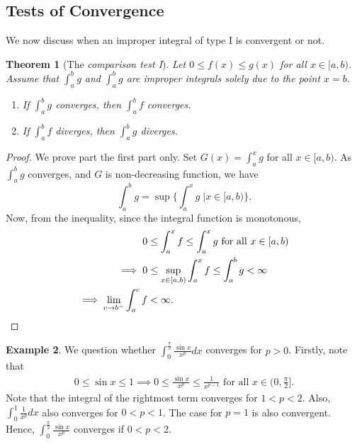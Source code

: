 \documentclass[15pt,a4paper]{book}
\newtheorem{theorem}{Theorem}[chapter]
\theoremstyle{definition}
\newtheorem{example}[theorem]{Example}
\newcommand{\eax}[1]{\emph{#1}\index{#1}} %
\begin{document}
\subsection{Tests of Convergence}
We now discuss when an improper integral of type I is convergent or not.
\begin{theorem}[The \eax{comparison test I}]
    Let $0 \leq f(x) \leq g(x)$ for all $x \in [a,b)$. Assume that $\int_{a}^{b} g$ and $\int_{a}^{b} g$ are improper integrals solely due to the point $x = b$.
    \begin{enumerate}
        \item If $\int_{a}^{b} g$ converges, then $\int_{a}^{b} f$ converges.
        \item If $\int_{a}^{b} f$ diverges, then $\int_{a}^{b} g$ diverges.
    \end{enumerate}
\end{theorem}
\begin{proof}
    We prove part the first part only. Set $G(x) = \int_{a}^{x} g$ for all $x \in [a,b)$. As $\int_{a}^{b} g$ converges, and $G$ is non-decreasing function, we have
    \begin{equation*}
        \int_{a}^{b} g = \sup \{\int_{a}^{x} g \; | x \in [a,b) \}.
    \end{equation*}
    Now, from the inequality, since the integral function is monotonous,
    \begin{align}
        0 &\leq \int_{a}^{x} f \leq \int_{a}^{x} g \text{ for all } x \in [a,b) \notag \\
        \implies 0 &\leq \sup_{x \in [a,b)} \int_{a}^{x} f \leq \int_{a}^{b} g < \infty \\
        \implies \lim_{c \to b^{-}} \int_{a}^{c} f &< \infty.
    \end{align}
\end{proof}

\begin{example}
    We question whether $\int_{0}^{\frac{\pi}{2}} \frac{\sin x}{x^{p}} dx$ converges for $p > 0$. Firstly, note that
    \begin{align*}
        0 \leq \sin x \leq 1 \implies 0 \leq \frac{\sin x}{x^{p}} \leq \frac{1}{x^{p-1}} \text{ for all } x \in (0, \frac{\pi}{2}].
    \end{align*}
    Note that the integral of the rightmost term converges for $1 < p < 2$. Also, $\int_{0}^{1} \frac{1}{x^{p}} dx$ also converges for $0 < p < 1$. The case for $p = 1$ is also convergent. Hence, $\int_{0}^{\frac{\pi}{2}} \frac{\sin x}{x^{p}}$ converges if $0 < p < 2$.
\end{example}
\end{document}
